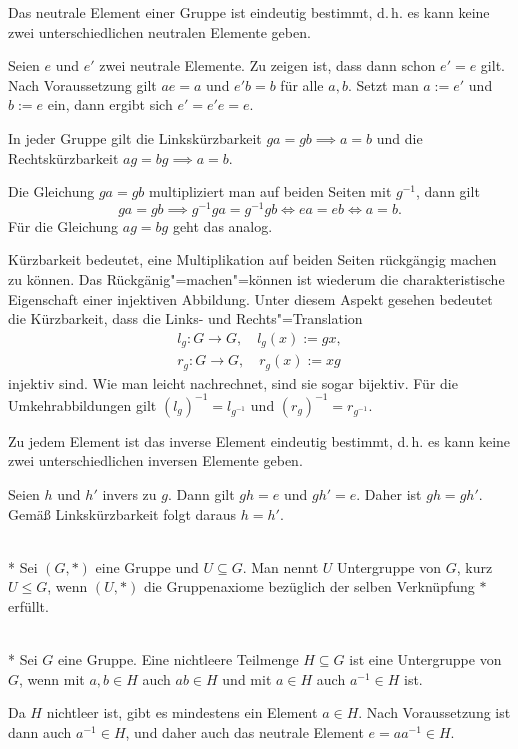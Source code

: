 \begin{Satz} Das neutrale Element einer Gruppe ist eindeutig bestimmt,
d.\,h. es kann keine zwei unterschiedlichen neutralen Elemente geben.
\end{Satz}
 Seien $e$ und $e'$ zwei neutrale Elemente.
Zu zeigen ist, dass dann schon $e'=e$ gilt. Nach Voraussetzung
gilt $ae=a$ und $e'b=b$ für alle $a,b$. Setzt man $a:=e'$ und
$b:=e$ ein, dann ergibt sich $e' = e'e = e.$\;\qedsymbol

\begin{Satz}
In jeder Gruppe gilt die Linkskürzbarkeit $ga=gb\implies a=b$
und die Rechtskürzbarkeit $ag=bg\implies a=b$.
\end{Satz}
 Die Gleichung $ga=gb$ multipliziert man auf beiden
Seiten mit $g^{-1}$, dann gilt
\[ga=gb \implies g^{-1}ga=g^{-1}gb \iff ea=eb \iff a=b.\]
Für die Gleichung $ag=bg$ geht das analog.\;\qedsymbol

Kürzbarkeit bedeutet, eine Multiplikation auf beiden Seiten
rückgängig machen zu können. Das Rückgänig"=machen"=können
ist wiederum die charakteristische Eigenschaft einer injektiven
Abbildung. Unter diesem Aspekt gesehen bedeutet die Kürzbarkeit,
dass die Links- und Rechts"=Translation
\begin{gather}
\label{eq:ltrans} l_g\colon G\to G,\quad l_g(x):=gx,\\
\label{eq:rtrans} r_g\colon G\to G,\quad r_g(x):=xg
\end{gather}
injektiv sind. Wie man leicht nachrechnet, sind sie sogar bijektiv.
Für die Umkehrabbildungen gilt $(l_g)^{-1}=l_{g^{-1}}$ und
$(r_g)^{-1}=r_{g^{-1}}$.

\begin{Satz} Zu jedem Element ist das inverse Element eindeutig
bestimmt, d.\,h. es kann keine zwei unterschiedlichen inversen
Elemente geben.
\end{Satz}
 Seien $h$ und $h'$ invers zu $g$. Dann gilt
$gh=e$ und $gh'=e$. Daher ist $gh=gh'$. Gemäß Linkskürzbarkeit
folgt daraus $h=h'$.\;\qedsymbol

\begin{Definition}[Untergruppe]\mbox{}\\*
Sei $(G,*)$ eine Gruppe und $U\subseteq G$.
Man nennt $U$ Untergruppe von $G$, kurz $U\le G$, wenn
$(U,*)$ die Gruppenaxiome bezüglich der selben Verknüpfung $*$
erfüllt.
\end{Definition}

\begin{Satz}[Untergruppenkriterium]\mbox{}\\*
Sei $G$ eine Gruppe. Eine nichtleere Teilmenge $H\subseteq G$ ist eine
Untergruppe von $G$, wenn mit $a,b\in H$ auch $ab\in H$ und
mit $a\in H$ auch $a^{-1}\in H$ ist.
\end{Satz}
Da $H$ nichtleer ist, gibt es mindestens ein
Element $a\in H$. Nach Voraussetzung ist dann auch $a^{-1}\in H$,
und daher auch das neutrale Element $e=aa^{-1}\in H$.

